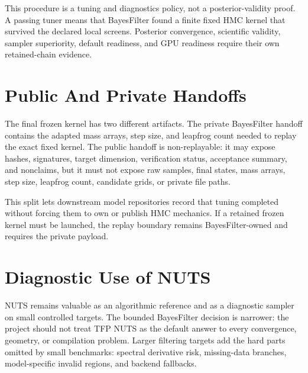 This procedure is a tuning and diagnostics policy, not a posterior-validity
proof.  A passing tuner means that BayesFilter found a finite fixed HMC kernel
that survived the declared local screens.  Posterior convergence, scientific
validity, sampler superiority, default readiness, and GPU readiness require
their own retained-chain evidence.

\section{Public And Private Handoffs}
\label{sec:bf-hmc-public-private-handoffs}

The final frozen kernel has two different artifacts.  The private BayesFilter
handoff contains the adapted mass arrays, step size, and leapfrog count needed
to replay the exact fixed kernel.  The public handoff is non-replayable: it may
expose hashes, signatures, target dimension, verification status, acceptance
summary, and nonclaims, but it must not expose raw samples, final states, mass
arrays, step size, leapfrog count, candidate grids, or private file paths.

This split lets downstream model repositories record that tuning completed
without forcing them to own or publish HMC mechanics.  If a retained frozen
kernel must be launched, the replay boundary remains BayesFilter-owned and
requires the private payload.

\section{Diagnostic Use of NUTS}
\label{sec:bf-nuts-diagnostic-use}

NUTS remains valuable as an algorithmic reference and as a diagnostic sampler on
small controlled targets.  The bounded BayesFilter decision is narrower: the
project should not treat TFP NUTS as the default answer to every convergence,
geometry, or compilation problem.  Larger filtering targets add the hard parts
omitted by small benchmarks: spectral derivative risk, missing-data branches,
model-specific invalid regions, and backend fallbacks.
